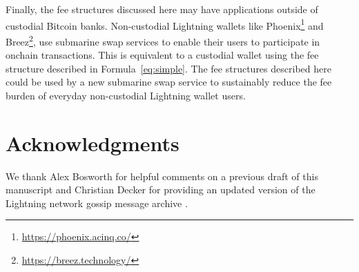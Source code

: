 \documentclass[10pt,twocolumn]{article}
\begin{document}
Finally, the fee structures discussed here
may have applications outside of custodial Bitcoin banks.
Non-custodial Lightning wallets like
Phoenix\footnote{\url{https://phoenix.acinq.co/}} and
Breez\footnote{\url{https://breez.technology/}},
use submarine swap services to enable their users to participate in onchain transactions.
This is equivalent to a custodial wallet using the fee structure
described in Formula~\ref{eq:simple}.
The fee structures described here could be used by a new
submarine swap service to sustainably reduce the fee
burden of everyday non-custodial Lightning wallet users.

\section*{Acknowledgments}

We thank Alex Bosworth for helpful comments on
a previous draft of this manuscript
and Christian Decker for providing an updated version
of the Lightning network gossip message archive \citep{lngossip}.


\end{document}
